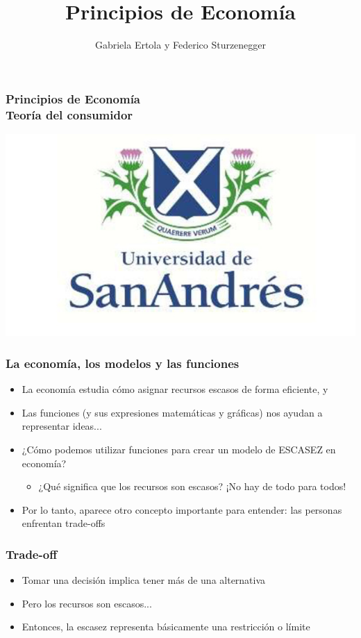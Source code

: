 \documentclass{beamer}
\title[Principios de Economía]{Principios de Economía}
\date{}
\author[Ertola y Sturzenegger]{Gabriela Ertola y Federico Sturzenegger }
\institute[]{Universidad de San Andrés \\
2022}
\begin{document}
\begin{frame}
\frametitle{Principios de Economía
\centering
\\ \vspace{12mm} Teoría del consumidor}
\centering 
\includegraphics[scale=0.25]{Figures/logoUDESA.jpg} 
\end{frame}

\begin{frame}
\frametitle{La economía, los modelos y las funciones}
\begin{itemize}
    \item La economía estudia cómo asignar recursos escasos de forma eficiente, y \vspace{2mm}
    \item Las funciones (y sus expresiones matemáticas y gráficas) nos ayudan a representar ideas... \vspace{2mm}
    \item ¿Cómo podemos utilizar funciones para crear un modelo de ESCASEZ en economía? 
    \begin{itemize}
        \item ¿Qué significa que los recursos son escasos? ¡No hay de todo para todos! 
    \end{itemize}
    \item Por lo tanto, aparece otro concepto importante para entender: las personas enfrentan trade-offs
\end{itemize} 
\end{frame}

\begin{frame}
\frametitle{Trade-off}
\begin{itemize}
    \item Tomar una decisión implica tener más de una alternativa \vspace{2mm}
    \item Pero los recursos son escasos...  \vspace{2mm}
    \item Entonces, la escasez representa básicamente una restricción o límite \vspace{2mm}
\end{itemize} 
\end{frame}
\end{document}
